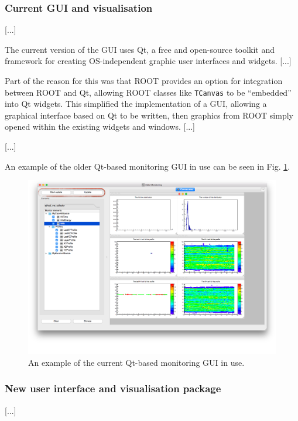 \subsubsection{Current GUI and visualisation} 
[...]

The current version of the GUI uses Qt, a free and open-source toolkit and framework for creating OS-independent graphic user interfaces and widgets. [...]

Part of the reason for this was that ROOT provides an option for integration between ROOT and Qt, allowing ROOT classes like \texttt{TCanvas} to be ``embedded'' into Qt widgets. This simplified the implementation of a GUI, allowing a graphical interface based on Qt to be written, then graphics from ROOT simply opened within the existing widgets and windows. [...] %

[...]

An example of the older Qt-based monitoring GUI in use can  be seen in Fig. \ref{figure:daq/dqm4hep/old-gui}. 

\begin{figure}
	\centering
	\includegraphics[width=1.0\textwidth]{../Pictures/DQM4hepMonitoringGui.png}
	\caption{An example of the current Qt-based monitoring GUI in use.}
	\label{figure:daq/dqm4hep/old-gui}
\end{figure}

\subsubsection{New user interface and visualisation package}
[...]

